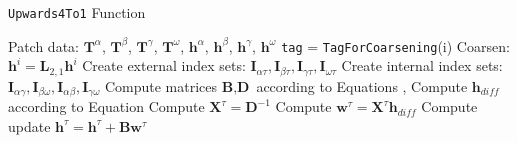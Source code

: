 \begin{algorithm}[H]
    \caption{\texttt{Upwards4To1} Function}
    \begin{algorithmic}[0]
        \Require Patch data: $\textbf{T}^{\alpha}$, $\textbf{T}^{\beta}$, $\textbf{T}^{\gamma}$, $\textbf{T}^{\omega}$, $\textbf{h}^{\alpha}$, $\textbf{h}^{\beta}$, $\textbf{h}^{\gamma}$, $\textbf{h}^{\omega}$
         
            \State \texttt{tag} = \texttt{TagForCoarsening}(i)
                \State Coarsen: $\textbf{h}^{i} = \textbf{L}_{2,1} \textbf{h}^{i}$
            \EndIf
        \EndFor
        \State Create external index sets: $\textbf{I}_{\alpha \tau}, \textbf{I}_{\beta \tau}, \textbf{I}_{\gamma \tau}, \textbf{I}_{\omega \tau}$ 
        \State Create internal index sets: $\textbf{I}_{\alpha \gamma}, \textbf{I}_{\beta \omega}, \textbf{I}_{\alpha \beta}, \textbf{I}_{\gamma \omega}$ 
        \State Compute matrices $\textbf{B}, \textbf{D}$ according to Equations , 
        \State Compute $\textbf{h}_{diff}$ according to Equation  
        \State {}
        \State Compute $\textbf{X}^{\tau} = \textbf{D}^{-1}$
        \State Compute $\textbf{w}^{\tau} = \textbf{X}^{\tau} \textbf{h}_{diff}$
        \State Compute update $\textbf{h}^{\tau} = \textbf{h}^{\tau} + \textbf{B} \textbf{w}^{\tau}$
    \end{algorithmic}
    \label{alg:upwards_merge}
\end{algorithm}

